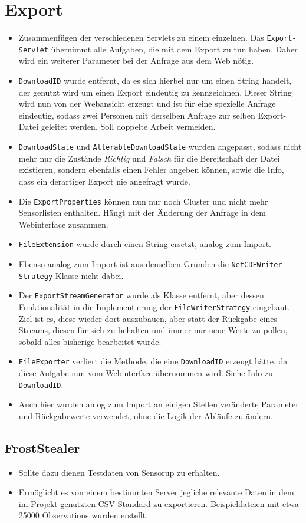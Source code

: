 \section{Export}
\begin{itemize}
	\item Zusammenfügen der verschiedenen Servlets zu einem einzelnen. Das \texttt{Export-\\Servlet} übernimmt alle Aufgaben, die mit dem Export zu tun haben. Daher wird ein weiterer Parameter bei der Anfrage aus dem Web nötig.
	\item \texttt{DownloadID} wurde entfernt, da es sich hierbei nur um einen String handelt, der genutzt wird um einen Export eindeutig zu kennzeichnen. Dieser String wird nun von der Webansicht erzeugt und ist für eine spezielle Anfrage eindeutig, sodass zwei Personen mit derselben Anfrage zur selben Export-Datei geleitet werden. Soll doppelte Arbeit vermeiden.
	\item \texttt{DownloadState} und \texttt{AlterableDownloadState} wurden angepasst, sodass nicht mehr nur die Zustände \textit{Richtig} und \textit{Falsch} für die Bereitschaft der Datei existieren, sondern ebenfalls einen Fehler angeben können, sowie die Info, dass ein derartiger Export nie angefragt wurde.
	\item Die \texttt{ExportProperties} können nun nur noch Cluster und nicht mehr Sensorlisten enthalten. Hängt mit der Änderung der Anfrage in dem Webinterface zusammen.
	\item \texttt{FileExtension} wurde durch einen String ersetzt, analog zum Import.
	\item Ebenso analog zum Import ist aus denselben Gründen die \texttt{NetCDFWriter-\\Strategy} Klasse nicht dabei.
	\item Der \texttt{ExportStreamGenerator} wurde als Klasse entfernt, aber dessen Funktionalität in die Implementierung der \texttt{FileWriterStrategy} eingebaut. Ziel ist es, diese wieder dort auszubauen, aber statt der Rückgabe eines Streams, diesen für sich zu behalten und immer nur neue Werte zu pollen, sobald alles bisherige bearbeitet wurde.
	\item \texttt{FileExporter} verliert die Methode, die eine \texttt{DownloadID} erzeugt hätte, da diese Aufgabe nun vom Webinterface übernommen wird. Siehe Info zu \texttt{DownloadID}.
	\item Auch hier wurden anlog zum Import an einigen Stellen veränderte Parameter und Rückgabewerte verwendet, ohne die Logik der Abläufe zu ändern.
\end{itemize}
\subsection{FrostStealer}
\begin{itemize}
	\item Sollte dazu dienen Testdaten von Sensorup zu erhalten.
	\item Ermöglicht es von einem bestimmten Server jegliche relevante Daten in dem im Projekt genutzten CSV-Standard zu exportieren. Beispieldateien mit etwa 25000 Observations wurden erstellt.
\end{itemize}